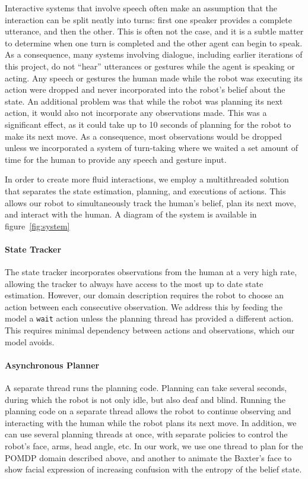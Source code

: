 \documentclass[conference]{IEEEtran}
\begin{document}
Interactive systems that involve speech often make an assumption that the interaction can be split neatly into turns: first one speaker provides a complete utterance, and then the other. This is often not the case, and it is a subtle matter to determine when one turn is completed and the other agent can begin to speak. As a consequence, many systems involving dialogue, including earlier iterations of this project, do not ``hear'' utterances or gestures while the agent is speaking or acting. Any speech or gestures the human made while the robot was executing its action were dropped and never incorporated into the robot's belief about the state. An additional problem was that while the robot was planning its next action, it would also not incorporate any observations made. This was a significant effect, as it could take up to 10 seconds of planning for the robot to make its next move. As a consequence, most observations would be dropped unless we incorporated a system of turn-taking where we waited a set amount of time for the human to provide any speech and gesture input. 


In order to create more fluid interactions, we employ a multithreaded solution that separates the state estimation, planning, and executions of actions. This allows our robot to simultaneously track the human's belief, plan its next move, and interact with the human. A diagram of the system is available in figure~\ref{fig:system}





\paragraph{State Tracker} The state tracker incorporates observations from the human at a very high rate, allowing the tracker to always have access to the most up to date state estimation. However, our domain description requires the robot to choose an action between each consecutive observation. We address this by feeding the model a \texttt{wait} action unless the planning thread has provided a different action. This requires minimal dependency between actions and observations, which our model avoids. 

\paragraph{Asynchronous Planner} A separate thread runs the planning code. Planning can take several seconds, during which the robot is not only idle, but also deaf and blind. Running the planning code on a separate thread allows the robot to continue observing and interacting with the human while the robot plans its next move. In addition, we can use several planning threads at once, with separate policies to control the robot's face, arms, head angle, etc. In our work, we use one thread to plan for the POMDP domain described above, and another to animate the Baxter's face to show facial expression of increasing confusion with the entropy of the belief state. 
\end{document}
